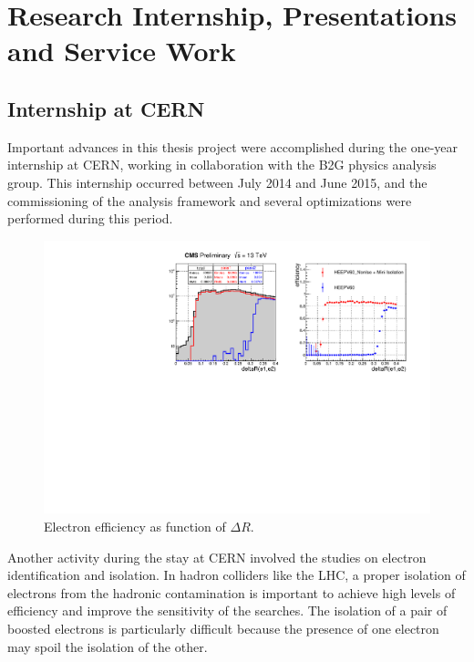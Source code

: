 \chapter{Research Internship, Presentations and Service Work}

\section{Internship at CERN}

Important  advances in this thesis project were accomplished during the one-year internship at CERN, working in collaboration with the B2G physics analysis group. This internship occurred between July 2014 and June 2015, and the commissioning of the analysis framework and several optimizations were performed during this period.

\begin{figure}[htb]
\begin{center}
\includegraphics[scale=0.8]{figures/systematics/deltaRleplep_heep.pdf}
\caption[Electron efficiency as function of deltaR]{Electron efficiency as function of $\Delta R$.}
\label{boostedDR}
\end{center}
\end{figure}

Another activity during the stay at CERN involved the studies on electron identification and isolation. In hadron colliders like the LHC, a proper isolation of electrons from the hadronic contamination is important to achieve high levels of efficiency and improve the sensitivity of the searches. The isolation of a pair of boosted electrons is particularly difficult because the presence of one electron may spoil the isolation of the other. 

